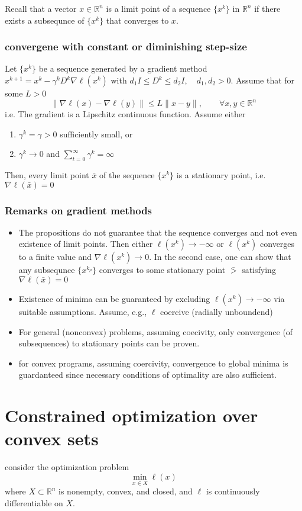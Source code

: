 \documentclass{book}
\newcommand{\R}{\mathbb{R}}
\theoremstyle{definition}
\theoremstyle{remark}
\theoremstyle{remark}
\begin{document}
Recall that a vector $x\in\R^n$ is a limit point of a sequence $\{x^k\}$ in $\R^n$ if there exists a subsequnce of $\{x^k\}$ that converges to $x$.

\subsubsection{convergene with constant or diminishing step-size}
Let $\{x^k\}$ be a sequence generated by a gradient method $x^{k+1}=x^k-\gamma^kD^k\nabla\ell(x^k)$ with $d_1I\leq D^k \leq d_2I, \quad d_1,d_2>0$. Assume that for some $L>0$ 
\[
    \|\nabla\ell(x)-\nabla\ell(y)\|\leq L\|x-y\|, \qquad \forall x,y\in\R^n
\]
i.e. The gradient is a Lipschitz continuous function.
Assume either
\begin{enumerate}
    \item $\gamma^k=\gamma>0$ sufficiently small, or 
    \item $\gamma^k\to 0$ and $\displaystyle\sum_{t=0}^{\infty}\gamma^k=\infty$
\end{enumerate}
Then, every limit point $\bar{x}$ of the sequence $\{x^k\}$ is a stationary point, i.e. $\nabla\ell(\bar{x})=0$

\subsubsection{Remarks on gradient methods}
\begin{itemize}
    \item The propositions do not guarantee that the sequence converges and not even existence of limit points. Then either $\ell(x^k)\to-\infty$ or $\ell(x^k)$ converges to a finite value and $\nabla\ell(x^k)\to 0$. In the second case, one can show that any subsequnce $\{x^{k_p}\}$ converges to some stationary point $\bar{>}$ satisfying $\nabla\ell(\bar{x})=0$
    \item Existence of minima can be guaranteed by excluding $\ell(x^k)\to-\infty$ via suitable assumptions. Assume, e.g., $\ell$ coercive (radially unboundend)
    \item For general (nonconvex) problems, assuming coecivity, only convergence (of subsequences) to stationary points can be proven.
    \item for convex programs, assuming coercivity, convergence to global minima is guardanteed since necessary conditions of optimality are also sufficient.
\end{itemize}

\section{Constrained optimization over convex sets}
consider the optimization problem 
\[
    \min_{x\in X}\ell(x)
\]
where $X \subset \R^n$ is nonempty, convex, and closed, and $\ell$ is continuously differentiable on $X$. 
\end{document}
